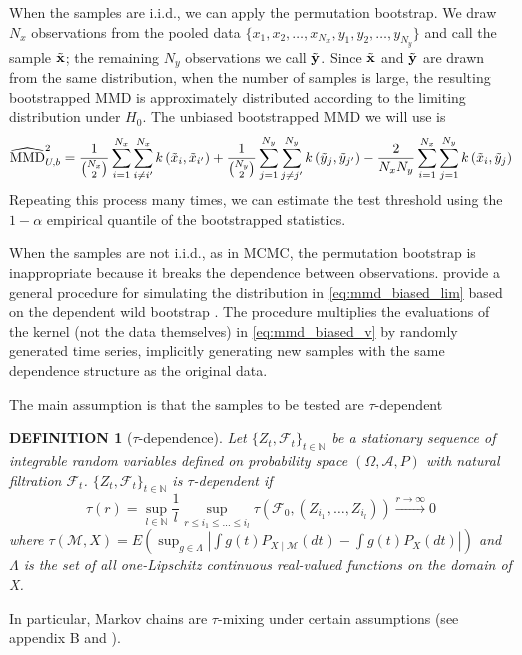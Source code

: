 \documentclass[a4paper,11pt]{article}
\newtheorem{definition}[theorem]{DEFINITION}
\begin{document}
When the samples are i.i.d., we can apply the permutation bootstrap. We draw $N_{x}$ observations from the pooled data $\{x_{1}, x_{2}, \ldots, x_{N_{x}}, y_{1}, y_{2}, \ldots, y_{N_{y}} \}$ and call the sample $\Tilde{\mathbf{x}}$; the remaining $N_{y}$ observations we call $\Tilde{\mathbf{y}}$. Since $\Tilde{\mathbf{x}}$ and $\Tilde{\mathbf{y}}$ are drawn from the same distribution, when the number of samples is large, the resulting bootstrapped MMD is approximately distributed according to the limiting distribution under $H_{0}$. The unbiased bootstrapped MMD we will use is
\begin{equation}
    \widehat{\mathrm{MMD}}_{U, b}^{2} = \frac{1}{{N_{x}\choose 2}} \sum_{i = 1}^{N_{x}} \sum_{i \neq i'}^{N_{x}} k\left(\Tilde{x}_{i}, \Tilde{x}_{i'}\right)+\frac{1}{{N_{y}\choose 2}} \sum_{j = 1}^{N_{y}} \sum_{j \neq j'}^{N_{y}} k\left(\Tilde{y}_{j}, \Tilde{y}_{j'}\right)-\frac{2}{N_{x}N_{y}} \sum_{i = 1}^{N_{x}} \sum_{j = 1}^{N_{y}} k\left(\Tilde{x}_{i}, \Tilde{y}_{j}\right)
    \label{eq:mmd_unbiased_permute}
\end{equation}
Repeating this process many times, we can estimate the test threshold using the $1-\alpha$ empirical quantile of the bootstrapped statistics.

When the samples are not i.i.d., as in MCMC, the permutation bootstrap is inappropriate because it breaks the dependence between observations. \cite{chwialkowski_wild_2016} provide a general procedure for simulating the distribution in \eqref{eq:mmd_biased_lim} based on the dependent wild bootstrap \cite{shao_dependent_2010}. The procedure multiplies the evaluations of the kernel (not the data themselves) in \eqref{eq:mmd_biased_v} by randomly generated time series, implicitly generating new samples with the same dependence structure as the original data.

The main assumption is that the samples to be tested are $\tau$-dependent
\begin{definition}[$\tau$-dependence]
Let $\{Z_{t}, \mathcal{F}_{t}\}_{t \in \mathbb{N}}$ be a stationary sequence of integrable random variables defined on probability space $(\Omega, \mathcal{A}, P)$ with natural filtration $\mathcal{F}_{t}$. $\{Z_{t}, \mathcal{F}_{t}\}_{t \in \mathbb{N}}$ is $\tau$-dependent if
\begin{equation}
    \tau(r)=\sup _{l \in \mathbb{N}} \frac{1}{l} \sup _{r \leq i_{1} \leq \ldots \leq i_{l}} \tau\left(\mathcal{F}_{0},\left(Z_{i_{1}}, \ldots, Z_{i_{l}}\right)\right) \stackrel{r \rightarrow \infty}{\longrightarrow} 0
\end{equation}
where $\tau(\mathcal{M}, X)=E\left(\sup _{g \in \Lambda}\left|\int g(t) P_{X \mid \mathcal{M}}(d t)-\int g(t) P_{X}(d t)\right|\right)$ and $\Lambda$ is the set of all one-Lipschitz continuous real-valued functions on the domain of X.
\end{definition}
In particular, Markov chains are $\tau$-mixing under certain assumptions (see \cite{chwialkowski_wild_2016} appendix B and \cite{dedecker_new_2005}).
\end{document}
